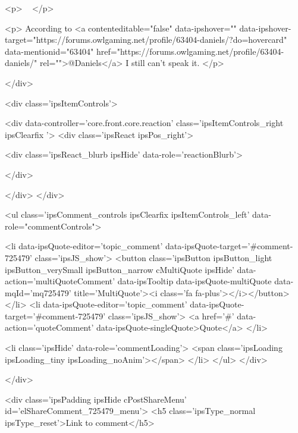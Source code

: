 <p>
	 
</p>

<p>
	According to <a contenteditable="false" data-ipshover="" data-ipshover-target="https://forums.owlgaming.net/profile/63404-daniels/?do=hovercard" data-mentionid="63404" href="https://forums.owlgaming.net/profile/63404-daniels/" rel="">@Daniels</a> I still can't speak it.
</p>


			
		</div>

		
			<div class='ipsItemControls'>
				
					
						

	<div data-controller='core.front.core.reaction' class='ipsItemControls_right ipsClearfix '>	
		<div class='ipsReact ipsPos_right'>
			
				
				<div class='ipsReact_blurb ipsHide' data-role='reactionBlurb'>
					
				</div>
			
			
			
		</div>
	</div>

					
				
				<ul class='ipsComment_controls ipsClearfix ipsItemControls_left' data-role="commentControls">
					
						
							<li data-ipsQuote-editor='topic_comment' data-ipsQuote-target='#comment-725479' class='ipsJS_show'>
								<button class='ipsButton ipsButton_light ipsButton_verySmall ipsButton_narrow cMultiQuote ipsHide' data-action='multiQuoteComment' data-ipsTooltip data-ipsQuote-multiQuote data-mqId='mq725479' title='MultiQuote'><i class='fa fa-plus'></i></button>
							</li>
							<li data-ipsQuote-editor='topic_comment' data-ipsQuote-target='#comment-725479' class='ipsJS_show'>
								<a href='#' data-action='quoteComment' data-ipsQuote-singleQuote>Quote</a>
							</li>
						
						
						
					
					<li class='ipsHide' data-role='commentLoading'>
						<span class='ipsLoading ipsLoading_tiny ipsLoading_noAnim'></span>
					</li>
				</ul>
			</div>
		

		
			

		
	</div>

	

	



<div class='ipsPadding ipsHide cPostShareMenu' id='elShareComment_725479_menu'>
	<h5 class='ipsType_normal ipsType_reset'>Link to comment</h5>
	
